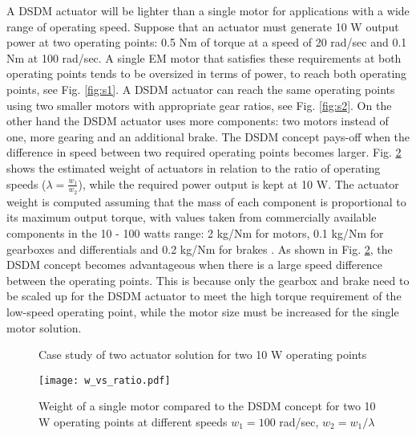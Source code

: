 A DSDM actuator will be lighter than a single motor for applications with a wide range of operating speed. Suppose that an actuator must generate 10 W output power at two operating points: 0.5 Nm of torque at a speed of 20 rad/sec and 0.1 Nm at 100 rad/sec. A single EM motor that satisfies these requirements at both operating points tends to be oversized in terms of power, to reach both operating points, see Fig. \ref{fig:s1}. A DSDM actuator can reach the same operating points using two smaller motors with appropriate gear ratios, see Fig. \ref{fig:s2}. On the other hand the DSDM actuator uses more components: two motors instead of one, more gearing and an additional brake. The DSDM concept pays-off when the difference in speed between two required operating points becomes larger.  Fig. \ref{fig:1vs2} shows the estimated weight of actuators in relation to the ratio of operating speeds ($\lambda=\frac{w_1}{w_2}$), while the required power output is kept at 10 W. The actuator weight is computed assuming that the mass of each component is proportional to its maximum output torque, with values taken from commercially available components in the 10 - 100 watts range: 2 kg/Nm for motors, 0.1 kg/Nm for gearboxes and differentials and 0.2 kg/Nm for brakes \cite{maxon_motor_usa}. As shown in Fig. \ref{fig:1vs2}, the DSDM concept becomes advantageous when there is a large speed difference between the operating points. This is because only the gearbox and brake need to be scaled up for the DSDM actuator to meet the high torque requirement of the low-speed operating point, while the motor size must be increased for the single motor solution.



\begin{figure}[H]
        \centering
        \caption{Case study of two actuator solution for two 10 W operating points }\label{fig:solutions}
\end{figure}

\begin{figure}[H]
	\centering
		\texttt{[image: w\_vs\_ratio.pdf]}
	\caption{Weight of a single motor compared to the DSDM concept for two 10 W operating points at different speeds $w_1=100$ rad/sec, $w_2 = w_1 / \lambda$}
	\label{fig:1vs2}
\end{figure}

